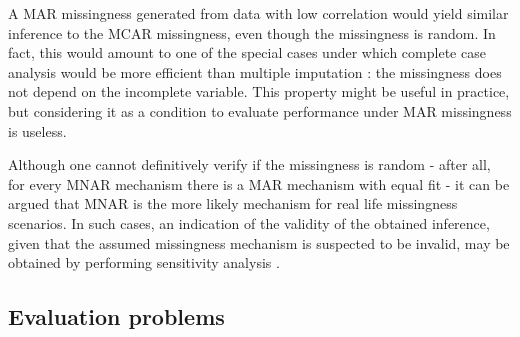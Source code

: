 \documentclass[bimj,fleqn]{w-art}
\theoremstyle{plain}
\theoremstyle{definition}
\begin{document}


A MAR missingness generated from data with low correlation would yield similar inference to the MCAR missingness, even though the missingness is random. In fact, this would amount to one of the special cases under which complete case analysis would be more efficient than multiple imputation \citep[see e.g.][p. 48]{fimd}: the missingness does not depend on the incomplete variable. This property might be useful in practice, but considering it as a condition to evaluate performance under MAR missingness is useless. 

Although one cannot definitively verify if the missingness is random - after all, for every MNAR mechanism there is a MAR mechanism with equal fit \citep{molenberghs2008every} - it can be argued that MNAR is the more likely mechanism for real life missingness scenarios. In such cases, an indication of the validity of the obtained inference, given that the assumed missingness mechanism is suspected to be invalid, may be obtained by performing sensitivity analysis \citep[see e.g.][part 5]{molenberghs2014handbook}.


\subsection{Evaluation problems}

\end{document}
